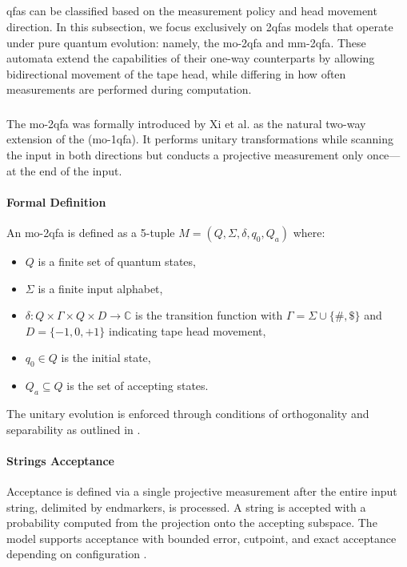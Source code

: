 \subsection{}
\label{sec:2-way-qfa}

\glspl{qfa} can be classified based on the measurement policy and head movement direction. In this subsection, we focus exclusively on \glspl{2qfa} models that operate under pure quantum evolution: namely, the \gls{mo-2qfa} and \gls{mm-2qfa}. These automata extend the capabilities of their one-way counterparts by allowing bidirectional movement of the tape head, while differing in how often measurements are performed during computation.

\subsubsection{}

The \gls{mo-2qfa} was formally introduced by Xi et al. \cite{xi2008some} as the natural two-way extension of the (\gls{mo-1qfa}). It performs unitary transformations while scanning the input in both directions but conducts a projective measurement only once—at the end of the input.

\paragraph{Formal Definition} An \gls{mo-2qfa} is defined as a 5-tuple $M = (Q, \Sigma, \delta, q_0, Q_a)$ where:
\begin{itemize}
    \item $Q$ is a finite set of quantum states,
    \item $\Sigma$ is a finite input alphabet,
    \item $\delta: Q \times \Gamma \times Q \times D \to \mathbb{C}$ is the transition function with $\Gamma = \Sigma \cup \{\#, \$\}$ and $D = \{-1, 0, +1\}$ indicating tape head movement,
    \item $q_0 \in Q$ is the initial state,
    \item $Q_a \subseteq Q$ is the set of accepting states.
\end{itemize}
The unitary evolution is enforced through conditions of orthogonality and separability as outlined in \cite{xi2008some}.

\paragraph{Strings Acceptance} Acceptance is defined via a single projective measurement after the entire input string, delimited by endmarkers, is processed. A string is accepted with a probability computed from the projection onto the accepting subspace. The model supports acceptance with bounded error, cutpoint, and exact acceptance depending on configuration \cite{xi2008some}.

